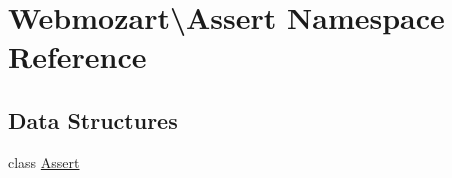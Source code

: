 \hypertarget{namespace_webmozart_1_1_assert}{}\section{Webmozart\textbackslash{}Assert Namespace Reference}
\label{namespace_webmozart_1_1_assert}
\subsection*{Data Structures}
\begin{DoxyCompactItemize}
\item 
class \mbox{\hyperlink{class_webmozart_1_1_assert_1_1_assert}{Assert}}
\end{DoxyCompactItemize}

